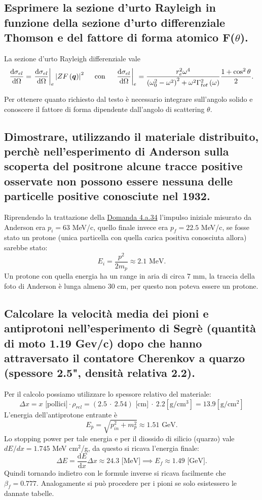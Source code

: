 \subsection[]{Esprimere la sezione d'urto Rayleigh in funzione della sezione d'urto differenziale Thomson e del fattore di forma atomico F($\theta$).
}
\label{sec:4.b.24}
La sezione d'urto Rayleigh differenziale vale
\[
	\frac{\mbox{d} \sigma_{el}}{\mbox{d} \Omega}= \left.\frac{\mbox{d} \sigma_{el}}{\mbox{d} \Omega} \right|_{e} \left| Z F\left( \boldsymbol{q} \right)  \right|^2 \quad
		\text{ con }
	\quad
	\left.\frac{\mbox{d} \sigma_{el }}{\mbox{d} \Omega} \right|_{e}= 
		\frac{r_e^2\omega^4}{\left( \omega_0^2-\omega^2 \right)^2 + \omega^2\Gamma_{tot}^2\left( \omega \right)} \frac{1+\cos^2\theta}{2}
.\] 

Per ottenere quanto richiesto dal testo è necessario integrare sull'angolo solido e conoscere il fattore di forma dipendente dall'angolo di scattering $\theta$.

\subsection[]{Dimostrare, utilizzando il materiale distribuito, perchè nell’esperimento di Anderson sulla scoperta del positrone alcune tracce positive osservate non
possono essere nessuna delle particelle positive conosciute nel 1932.
}
\label{sec:4.b.25}
Riprendendo la trattazione della \hyperref[sec:4.a.34]{Domanda 4.a.34} l'impulso iniziale misurato da Anderson era $p_{i}= 63$ MeV/c, quello finale invece era $p_{f}=22.5$ MeV/c, se fosse stato un protone (unica particella con quella carica positiva conosciuta allora) sarebbe stato:
\[
	E_{i}= \frac{p^2}{2m_{p}}\approx 2.1 \text{ MeV}
.\] 
Un protone con quella energia ha un range in aria di circa $7$ mm, la traccia della foto di Anderson è lunga almeno $30$ cm, per questo non poteva essere un protone.


\subsection[]{Calcolare la velocità media dei pioni e antiprotoni nell'esperimento di Segrè (quantità di moto 1.19 Gev/c) dopo che hanno attraversato il contatore Cherenkov a quarzo (spessore 2.5", densità relativa 2.2).
}
\label{sec:4.b.26}
Per il calcolo possiamo utilizzare lo spessore relativo del materiale: 
\[
	\Delta x = x \text{ [pollici]}\cdot \rho_{rel}= (2.5 \ \cdot \ 2.54) \text{ [cm]} \ \cdot \ 2.2 \left[\text{g}/\text{cm}^3 \right] = 13.9\left[\text{g}/\text{cm}^2 \right]
\]
L'energia dell'antiprotone entrante è 
\[
	E_{\overline{p}} = \sqrt{ p_{in}^2+m_{p}^2} \approx 1.51 \text{ GeV}
.\] 
Lo stopping power per tale energia e per il diossido di silicio (quarzo) vale $dE /dx = 1.745$ MeV cm$^2$/g, da questo si ricava l'energia finale:
\[
	\Delta E = \frac{\mbox{d} E}{\mbox{d} x} \Delta x \approx 24.3 \text{ [MeV]} \implies E_{f} \approx 1.49 \text{ [GeV]}
.\] 
Quindi tornando indietro con le formule inverse si ricava facilmente che $\beta_{f}= 0.777$. Analogamente si può procedere per i pioni se solo esistessero le dannate tabelle.



